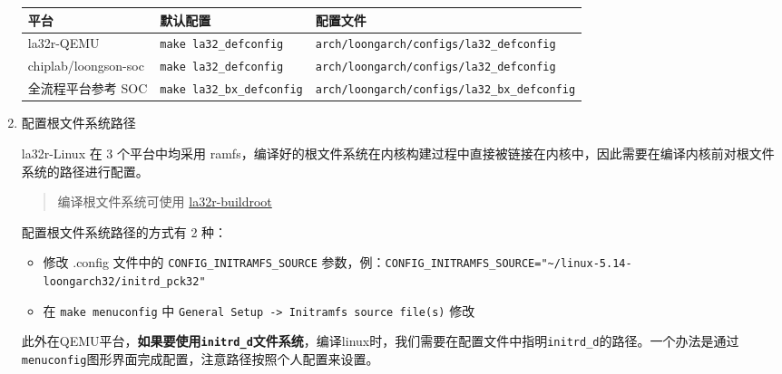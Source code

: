 \begin{enumerate}
  \begin{longtable}[]{@{}
    >{\centering\arraybackslash}p{}
    >{\centering\arraybackslash}p{}
    >{\centering\arraybackslash}p{}@{}}
  \toprule\noalign{}
  \begin{minipage}[b]{\linewidth}\centering
  平台
  \end{minipage} & \begin{minipage}[b]{\linewidth}\centering
  默认配置
  \end{minipage} & \begin{minipage}[b]{\linewidth}\centering
  配置文件
  \end{minipage} \\
  \midrule\noalign{}
  \endhead
  \bottomrule\noalign{}
  \endlastfoot
  la32r-QEMU & \texttt{make\ la32\_defconfig} & \texttt{arch/loongarch/configs/la32\_defconfig} \\
  chiplab/loongson-soc & \texttt{make\ la32\_defconfig} & \texttt{arch/loongarch/configs/la32\_defconfig} \\
  全流程平台参考 SOC & \texttt{make\ la32\_bx\_defconfig} & \texttt{arch/loongarch/configs/la32\_bx\_defconfig} \\
  \end{longtable}
\item
  配置根文件系统路径

  la32r-Linux 在 3 个平台中均采用 ramfs，编译好的根文件系统在内核构建过程中直接被链接在内核中，因此需要在编译内核前对根文件系统的路径进行配置。

  \begin{quote}
  编译根文件系统可使用 \href{https://gitee.com/loongson-edu/la32r-buildroot}{la32r-buildroot}
  \end{quote}

  配置根文件系统路径的方式有 2 种：

  \begin{itemize}
  \tightlist
  \item
    修改 .config 文件中的 \texttt{CONFIG\_INITRAMFS\_SOURCE} 参数，例：\texttt{CONFIG\_INITRAMFS\_SOURCE="\textasciitilde{}/linux-5.14-loongarch32/initrd\_pck32"}
  \item
    在 \texttt{make\ menuconfig} 中 \texttt{General\ Setup\ -\textgreater{}\ Initramfs\ source\ file(s)} 修改
  \end{itemize}

  此外在QEMU平台，\textbf{如果要使用\texttt{initrd\_d}文件系统}，编译linux时，我们需要在配置文件中指明\texttt{initrd\_d}的路径。一个办法是通过\texttt{menuconfig}图形界面完成配置，注意路径按照个人配置来设置。


\end{enumerate}
